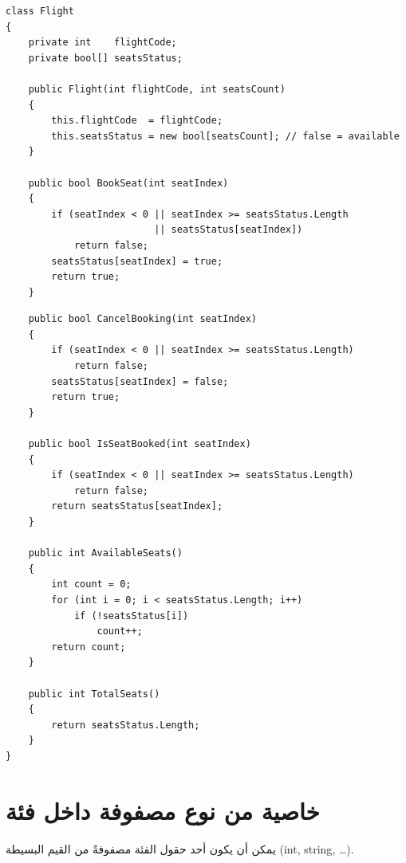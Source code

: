 \documentclass[14pt]{extarticle}
\begin{document}
{\small
\begin{boxExample}
\begin{english}
\begin{verbatim}
class Flight
{
    private int    flightCode;
    private bool[] seatsStatus;

    public Flight(int flightCode, int seatsCount)
    {
        this.flightCode  = flightCode;
        this.seatsStatus = new bool[seatsCount]; // false = available
    }

    public bool BookSeat(int seatIndex)
    {
        if (seatIndex < 0 || seatIndex >= seatsStatus.Length
                          || seatsStatus[seatIndex])
            return false;
        seatsStatus[seatIndex] = true;
        return true;
    }
\end{verbatim}
\end{english}
\end{boxExample}
\begin{boxExample}
\begin{english}
\begin{verbatim}
    public bool CancelBooking(int seatIndex)
    {
        if (seatIndex < 0 || seatIndex >= seatsStatus.Length)
            return false;
        seatsStatus[seatIndex] = false;
        return true;
    }

    public bool IsSeatBooked(int seatIndex)
    {
        if (seatIndex < 0 || seatIndex >= seatsStatus.Length)
            return false;
        return seatsStatus[seatIndex];
    }

    public int AvailableSeats()
    {
        int count = 0;
        for (int i = 0; i < seatsStatus.Length; i++)
            if (!seatsStatus[i])
                count++;
        return count;
    }

    public int TotalSeats()
    {
        return seatsStatus.Length;
    }
}
\end{verbatim}
\end{english}
\end{boxExample}
}

\clearpage
\section{خاصية من نوع مصفوفة داخل فئة}

يمكن أن يكون أحد حقول الفئة مصفوفةً من القيم البسيطة (\textenglish{int}, \textenglish{string}, \ldots).
\end{document}

